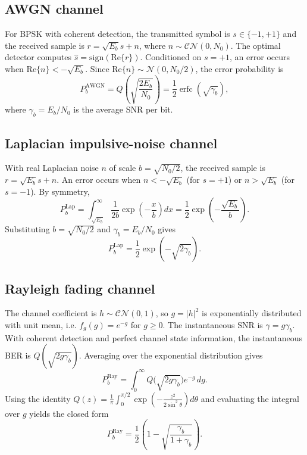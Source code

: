 \documentclass[12pt,a4paper]{article}
\begin{document}
\subsection{AWGN channel}
For BPSK with coherent detection, the transmitted symbol is $s\in\{-1,+1\}$ and the received sample is $r=\sqrt{E_b}s+n$, where $n\sim\mathcal{CN}(0,N_0)$. The optimal detector computes $\hat{s}=\mathrm{sign}(\mathrm{Re}\{r\})$. Conditioned on $s=+1$, an error occurs when $\mathrm{Re}\{n\}<-\sqrt{E_b}$. Since $\mathrm{Re}\{n\}\sim\mathcal{N}(0,N_0/2)$, the error probability is
\begin{equation}
    P_b^{\text{AWGN}}=Q\!\left(\sqrt{\frac{2E_b}{N_0}}\right)
    =\frac{1}{2}\operatorname{erfc}\!\left(\sqrt{\gamma_b}\right),
\end{equation}
where $\gamma_b=E_b/N_0$ is the average SNR per bit.

\subsection{Laplacian impulsive-noise channel}
With real Laplacian noise $n$ of scale $b=\sqrt{N_0/2}$, the received sample is $r=\sqrt{E_b}s+n$. An error occurs when $n<-\sqrt{E_b}$ (for $s=+1$) or $n>\sqrt{E_b}$ (for $s=-1$). By symmetry,
\begin{equation}
    P_b^{\text{Lap}}=\int_{\sqrt{E_b}}^{\infty}\frac{1}{2b}\exp\!\left(-\frac{x}{b}\right)dx
    =\frac{1}{2}\exp\!\left(-\frac{\sqrt{E_b}}{b}\right).
\end{equation}
Substituting $b=\sqrt{N_0/2}$ and $\gamma_b=E_b/N_0$ gives
\begin{equation}
    P_b^{\text{Lap}}=\frac{1}{2}\exp\!\left(-\sqrt{2\gamma_b}\right).
\end{equation}

\subsection{Rayleigh fading channel}
The channel coefficient is $h\sim\mathcal{CN}(0,1)$, so $g=|h|^2$ is exponentially distributed with unit mean, i.e. $f_g(g)=e^{-g}$ for $g\ge 0$. The instantaneous SNR is $\gamma=g\gamma_b$. With coherent detection and perfect channel state information, the instantaneous BER is $Q(\sqrt{2g\gamma_b})$. Averaging over the exponential distribution gives
\begin{equation}
    P_b^{\text{Ray}}=\int_0^{\infty}Q\bigl(\sqrt{2g\gamma_b}\bigr)e^{-g}\,dg.
\end{equation}
Using the identity $Q(z)=\frac{1}{\pi}\int_0^{\pi/2}\exp\!\left(-\frac{z^2}{2\sin^2\theta}\right)d\theta$ and evaluating the integral over $g$ yields the closed form
\begin{equation}
    P_b^{\text{Ray}}=\frac{1}{2}\left(1-\sqrt{\frac{\gamma_b}{1+\gamma_b}}\right).
\end{equation}
\end{document}
